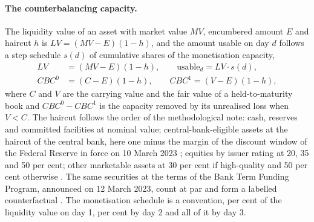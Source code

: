\paragraph{The counterbalancing capacity.}
The liquidity value of an asset with market value $MV$, encumbered amount $E$ and haircut $h$ is $LV=(MV-E)(1-h)$, and the amount usable on day $d$ follows a step schedule $s(d)$ of cumulative shares of the monetisation capacity,
\begin{align}
LV&=(MV-E)(1-h),\qquad \text{usable}_d=LV\cdot s(d),\label{eq:alm-cbc}\\
CBC^{0}&=(C-E)(1-h),\qquad CBC^{1}=(V-E)(1-h),\label{eq:alm-htm}
\end{align}
where $C$ and $V$ are the carrying value and the fair value of a held-to-maturity book and $CBC^{0}-CBC^{1}$ is the capacity removed by its unrealised loss when $V<C$. The haircut follows the order of the methodological note: cash, reserves and committed facilities at nominal value; central-bank-eligible assets at the haircut of the central bank, here one minus the margin of the discount window of the Federal Reserve in force on 10 March 2023 \citep{alm:frbmargins}; equities by issuer rating at 20, 35 and 50 per cent; other marketable assets at 30 per cent if high-quality and 50 per cent otherwise \citep{alm:ecb2019note}. The same securities at the terms of the Bank Term Funding Program, announced on 12 March 2023, count at par and form a labelled counterfactual \citep{alm:frbbtfp}. The monetisation schedule is a convention, \almLMonetDayOne{} per cent of the liquidity value on day 1, \almLMonetDayTwo{} per cent by day 2 and all of it by day 3.

